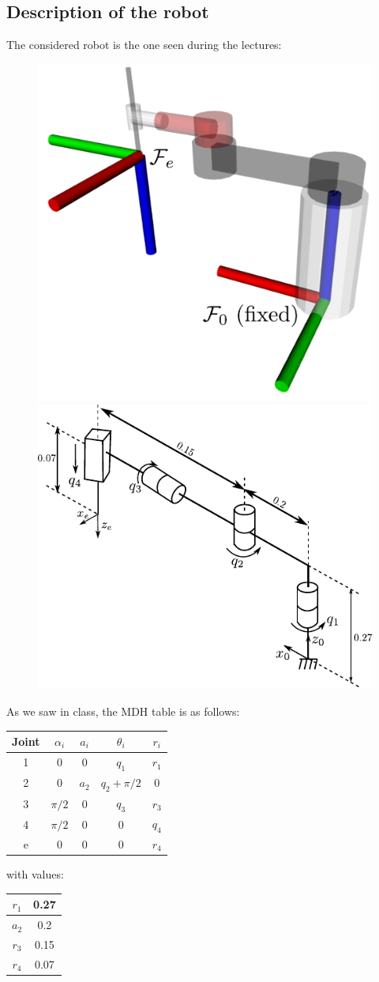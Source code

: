 \documentclass{ecnreport}
\begin{document}

\subsection*{Description of the robot}

The considered robot is the one seen during the lectures:
\begin{figure}[h!]\centering
\includegraphics[height=.4\linewidth]{rrrp_rviz} \quad
\includegraphics[height=.4\linewidth]{rrrp}   
\end{figure}

As we saw in class, the MDH table is as follows:
\begin{center}
\begin{tabular}{|c|c|c|c|c|}\hline
        Joint & $\alpha_i$ & $a_i$ &  $\theta_i$ & $r_i$\\\hline 
        1 & 0 & 0 & $q_1$ & $r_1$ \\\hline
        2 & 0& $a_2$  & $q_2+\pi/2$ & 0\\\hline
        3 & $\pi/2$ & 0 & $q_3$ & $r_3$\\\hline
        4 & $\pi/2$ & 0 & 0 & $q_4$\\\hline
        e & 0 & 0 & 0 & $r_4$\\\hline
    \end{tabular}
    with values: \begin{tabular}{|c|c|}\hline		
        $r_1$ & 0.27\\\hline
        $a_2$ & 0.2\\\hline
        $r_3$ & 0.15\\\hline
        $r_4$ & 0.07\\\hline
    \end{tabular}
\end{center}
\end{document}

